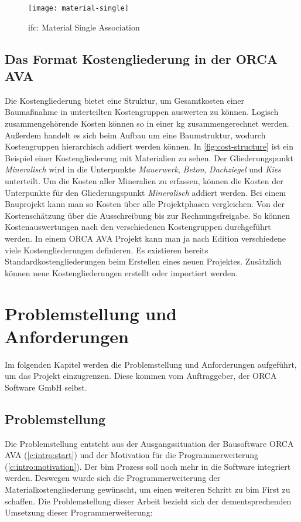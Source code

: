 \begin{figure}[h]
	\centering
	\texttt{[image: material-single]}
	\caption{\ac{ifc}: Material Single Association}
	\label{fig:material-single}
\end{figure}

\section{Das Format Kostengliederung in der ORCA AVA}
\label{c:basics:coststructure}
Die Kostengliederung bietet eine Struktur, um Gesamtkosten einer Baumaßnahme in unterteilten Kostengruppen auswerten zu können. Logisch zusammengehörende Kosten können so in einer \ac{kg} zusammengerechnet werden. Außerdem handelt es sich beim Aufbau um eine Baumstruktur, wodurch Kostengruppen hierarchisch addiert werden können. In \autoref{fig:cost-structure} ist ein Beispiel einer Kostengliederung mit Materialien zu sehen. Der Gliederungspunkt \textit{Mineralisch} wird in die Unterpunkte \textit{Mauerwerk}, \textit{Beton}, \textit{Dachziegel} und \textit{Kies} unterteilt. Um die Kosten aller Mineralien zu erfassen, können die Kosten der Unterpunkte für den Gliederungspunkt \textit{Mineralisch} addiert werden.
Bei einem Bauprojekt kann man so Kosten über alle Projektphasen vergleichen. Von der Kostenschätzung über die Ausschreibung bis zur Rechnungsfreigabe. So können Kostenauswertungen nach den verschiedenen Kostengruppen durchgeführt werden. In einem ORCA AVA Projekt kann man ja nach Edition verschiedene viele Kostengliederungen definieren. Es existieren bereits Standardkostengliederungen beim Erstellen eines neuen Projektes. Zusätzlich können neue Kostengliederungen erstellt oder importiert werden.\citep[vgl.][]{helpdesk-kostengliederungen}

\chapter{Problemstellung und Anforderungen}
\label{c:requirements}
Im folgenden Kapitel werden die Problemstellung und Anforderungen aufgeführt, um das Projekt einzugrenzen. Diese kommen vom Auftraggeber, der \glqq ORCA Software GmbH\grqq{} selbst.

\section{Problemstellung}
\label{c:requirements:problem}

Die Problemstellung entsteht aus der Ausgangssituation der Bausoftware ORCA AVA (\autoref{c:intro:start}) und der Motivation für die Programmerweiterung (\autoref{c:intro:motivation}). Der \ac{bim} Prozess soll noch mehr in die Software integriert werden. Deswegen wurde sich die Programmerweiterung der Materialkostengliederung gewünscht, um einen weiteren Schritt zu \glqq \ac{bim} First\grqq{} zu schaffen. Die Problemstellung dieser Arbeit bezieht sich der dementsprechenden Umsetzung dieser Programmerweiterung:

